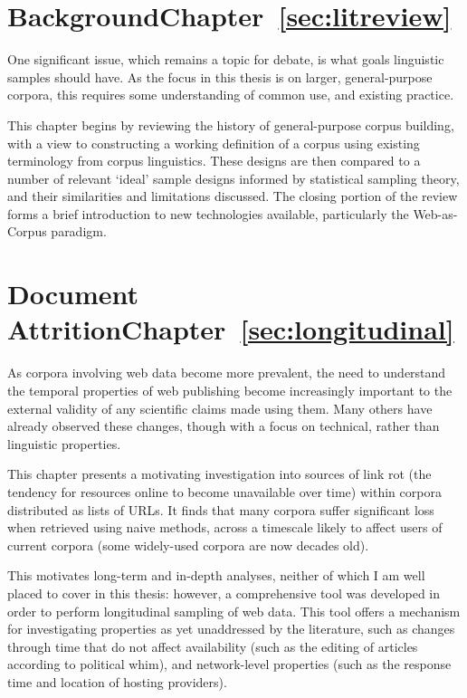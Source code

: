 \section*{Background\hfill{}Chapter~\ref{sec:litreview}}
One significant issue, which remains a topic for debate, is what goals linguistic samples should have.  As the focus in this thesis is on larger, general-purpose corpora, this requires some understanding of common use, and existing practice.

This chapter begins by reviewing the history of general-purpose corpus building, with a view to constructing a working definition of a corpus using existing terminology from corpus linguistics.  These designs are then compared to a number of relevant `ideal' sample designs informed by statistical sampling theory, and their similarities and limitations discussed.  The closing portion of the review forms a brief introduction to new technologies available, particularly the Web-as-Corpus paradigm.


\section*{Document Attrition\hfill{}Chapter~\ref{sec:longitudinal}}
As corpora involving web data become more prevalent, the need to understand the temporal properties of web publishing become increasingly important to the external validity of any scientific claims made using them.  Many others have already observed these changes, though with a focus on technical, rather than linguistic properties.

This chapter presents a motivating investigation into sources of link rot (the tendency for resources online to become unavailable over time) within corpora distributed as lists of URLs.  It finds that many corpora suffer significant loss when retrieved using naive methods, across a timescale likely to affect users of current corpora (some widely-used corpora are now decades old).

This motivates long-term and in-depth analyses, neither of which I am well placed to cover in this thesis: however, a comprehensive tool was developed in order to perform longitudinal sampling of web data.  This tool offers a mechanism for investigating properties as yet unaddressed by the literature, such as changes through time that do not affect availability (such as the editing of articles according to political whim), and network-level properties (such as the response time and location of hosting providers).

